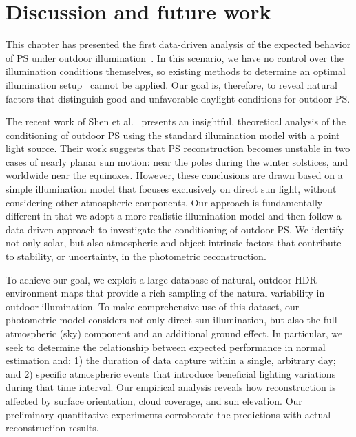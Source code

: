 \section{Discussion and future work}
\label{sec:3dv-discussion}
\label{sec:iccp-discussion}

This chapter has presented the first data-driven analysis of the expected behavior of PS under outdoor illumination~\cite{holdgeoffroy-iccp-15,holdgeoffroy-3dv-15}. In this scenario, we have no control over the illumination conditions themselves, so existing methods to determine an optimal illumination setup~\cite{drbohlav-iccv-05,klaudiny-prl-14} cannot be applied. Our goal is, therefore, to reveal natural factors that distinguish good and unfavorable daylight conditions for outdoor PS.

The recent work of Shen et al.~\cite{shen-pg-14} presents an insightful, theoretical analysis of the conditioning of outdoor PS using the standard illumination model with a point light source. Their work suggests that PS reconstruction becomes unstable in two cases of nearly planar sun motion: near the poles during the winter solstices, and worldwide near the equinoxes. However, these conclusions are drawn based on a simple illumination model that focuses exclusively on direct sun light, without considering other atmospheric components. Our approach is fundamentally different in that we adopt a more realistic illumination model and then follow a data-driven approach to investigate the conditioning of outdoor PS. We identify not only solar, but also atmospheric and object-intrinsic factors that contribute to stability, or uncertainty, in the photometric reconstruction.


To achieve our goal, we exploit a large database of natural, outdoor HDR environment maps that provide a rich sampling of the natural variability in outdoor illumination. To make comprehensive use of this dataset, our photometric model considers not only direct sun illumination, but also the full atmospheric (sky) component and an additional ground effect. In particular, we seek to determine the relationship between expected performance in normal estimation and: 1) the duration of data capture within a single, arbitrary day; and 2) specific atmospheric events that introduce beneficial lighting variations during that time interval. Our empirical analysis reveals how reconstruction is affected by surface orientation, cloud coverage, and sun elevation. Our preliminary quantitative experiments corroborate the predictions with actual reconstruction results.

